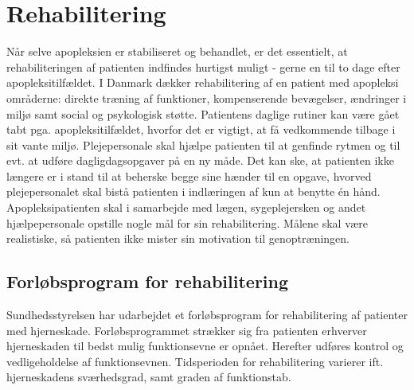 \section{Rehabilitering}
Når selve apopleksien er stabiliseret og behandlet, er det essentielt, at rehabiliteringen af patienten indfindes hurtigst muligt - gerne en til to dage efter apopleksitilfældet. I Danmark dækker rehabilitering af en patient med apopleksi områderne: direkte træning af funktioner, kompenserende bevægelser, ændringer i miljø samt social og psykologisk støtte. Patientens daglige rutiner kan være gået tabt pga. apopleksitilfældet, hvorfor det er vigtigt, at få vedkommende tilbage i sit vante miljø. Plejepersonale skal hjælpe patienten til at genfinde rytmen og til evt. at udføre dagligdagsopgaver på en ny måde. Det kan ske, at patienten ikke længere er i stand til at beherske begge sine hænder til en opgave, hvorved plejepersonalet skal bistå patienten i indlæringen af kun at benytte én hånd. \cite{Kruuse2015} \\
Apopleksipatienten skal i samarbejde med lægen, sygeplejersken og andet hjælpepersonale opstille nogle mål for sin rehabilitering. Målene skal være realistiske, så patienten ikke mister sin motivation til genoptræningen. \cite{Kruuse2015}

\subsection{Forløbsprogram for rehabilitering} 
Sundhedsstyrelsen har udarbejdet et forløbsprogram for rehabilitering af patienter med hjerneskade. Forløbsprogrammet strækker sig fra patienten erhverver hjerneskaden til bedst mulig funktionsevne er opnået. Herefter udføres kontrol og vedligeholdelse af funktionsevnen. Tidsperioden for rehabilitering varierer ift. hjerneskadens sværhedsgrad, samt graden af funktionstab. %
\cite{Sundhedsstyrelsen2011a}

